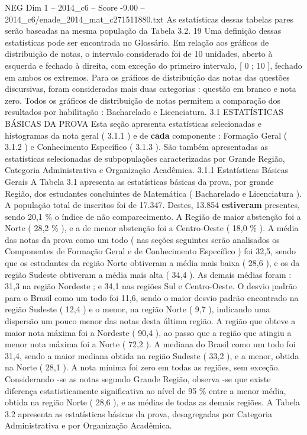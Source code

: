 \begin{textsample}{NEG Dim 1 – 2014\_c6 – Score -9.00 – 2014\_c6/enade\_2014\_mat\_c271511880.txt}
As estatísticas dessas tabelas pares serão baseadas na mesma população da Tabela 3.2. 19 Uma definição dessas estatísticas pode ser encontrada no Glossário.
Em relação aos gráficos de distribuição de notas, o intervalo considerado foi de 10 unidades, aberto à esquerda e fechado à direita, com exceção do primeiro intervalo, [ 0 ; 10 ], fechado em ambos os extremos.
Para os gráficos de distribuição das notas das questões discursivas, foram consideradas mais duas categorias : questão em branco e nota zero.
Todos os gráficos de distribuição de notas permitem a comparação dos resultados por habilitação : Bacharelado e Licenciatura. 3.1 ESTATÍSTICAS BÁSICAS DA PROVA Esta seção apresenta estatísticas selecionadas e histogramas da nota geral ( 3.1.1 ) e de \textbf{cada} componente : Formação Geral ( 3.1.2 ) e Conhecimento Específico ( 3.1.3 ).
São também apresentadas as estatísticas selecionadas de subpopulações caracterizadas por Grande Região, Categoria Administrativa e Organização Acadêmica. 3.1.1 Estatísticas Básicas Gerais A Tabela 3.1 apresenta as estatísticas básicas da prova, por grande Região, dos estudantes concluintes de Matemática ( Bacharelado e Licenciatura ).
A população total de inscritos foi de 17.347.
Destes, 13.854 \textbf{estiveram} presentes, sendo 20,1 \% o índice de não comparecimento.
A Região de maior abstenção foi a Norte ( 28,2 \% ), e a de menor abstenção foi a Centro-Oeste ( 18,0 \% ).
A média das notas da prova como um todo ( nas seções seguintes serão analisados os Componentes de Formação Geral e de Conhecimento Específico ) foi 32,5, sendo que os estudantes da região Norte obtiveram a média mais baixa ( 28,6 ), e os da região Sudeste obtiveram a média mais alta ( 34,4 ).
As demais médias foram : 31,3 na região Nordeste ; e 34,1 nas regiões Sul e Centro-Oeste.
O desvio padrão para o Brasil como um todo foi 11,6, sendo o maior desvio padrão encontrado na região Sudeste ( 12,4 ) e o menor, na região Norte ( 9,7 ), indicando uma dispersão um pouco menor das notas desta última região.
A região que obteve a maior nota máxima foi a Nordeste ( 90,4 ), ao passo que a região que atingiu a menor nota máxima foi a Norte ( 72,2 ).
A mediana do Brasil como um todo foi 31,4, sendo a maior mediana obtida na região Sudeste ( 33,2 ), e a menor, obtida na Norte ( 28,1 ).
A nota mínima foi zero em todas as regiões, sem exceção.
Considerando -se as notas segundo Grande Região, observa -se que existe diferença estatisticamente significativa ao nível de 95 \% entre a menor média, obtida na região Norte ( 28,6 ), e as médias de todas as demais regiões.
A Tabela 3.2 apresenta as estatísticas básicas da prova, desagregadas por Categoria Administrativa e por Organização Acadêmica.

\end{textsample}
